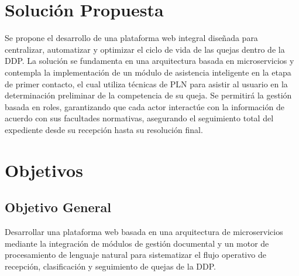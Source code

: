     \section{Solución Propuesta}

        Se propone el desarrollo de una plataforma web integral diseñada para centralizar, automatizar y optimizar el ciclo de vida de las quejas dentro de la DDP. La solución se fundamenta en una arquitectura basada en microservicios y contempla la implementación de un módulo de asistencia inteligente en la etapa de primer contacto, el cual utiliza técnicas de PLN para asistir al usuario en la determinación preliminar de la competencia de su queja. Se permitirá la gestión basada en roles, garantizando que cada actor interactúe con la información de acuerdo con sus facultades normativas, asegurando el seguimiento total del expediente desde su recepción hasta su resolución final.

    \section{Objetivos}

        \subsection{Objetivo General}

            Desarrollar una plataforma web basada en una arquitectura de microservicios mediante la integración de módulos de gestión documental y un motor de procesamiento de lenguaje natural para sistematizar el flujo operativo de recepción, clasificación y seguimiento de quejas de la DDP.
        
